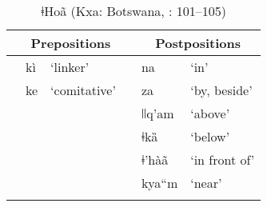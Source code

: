 \documentclass[output=paper]{langsci/langscibook}
\begin{document}
\begin{table}
\caption{ǂHoã (Kxa: Botswana, \citealt{CollinsGruber2014}: 101–105)}
\label{extab:dryer:24} 

\begin{tabularx}{\textwidth}{lll lll} 
\lsptoprule
 & \multicolumn{2}{c}{\bfseries Prepositions} &  & \multicolumn{2}{c}{\bfseries Postpositions}\\
\midrule
 & kì & ‘linker’ &  & na & ‘in’\\
 & ke & ‘comitative’ &  & za & ‘by, beside’\\
 &  &  &  & ǀǀq'am & ‘above’\\
 &  &  &  & ǂkȁ & ‘below’\\
 &  &  &  & ǂ’hàã & ‘in front of’\\
 &  &  &  & kya“m & ‘near’\\
\lspbottomrule
\end{tabularx}
\end{table}

\begin{table}
\caption{ Koromfe (Niger-Congo, Gur: Burkina Faso, Mali, \citealt{Rennison1997}, 2017)}
\label{extab:dryer:25} 
\end{table}
\end{document}

